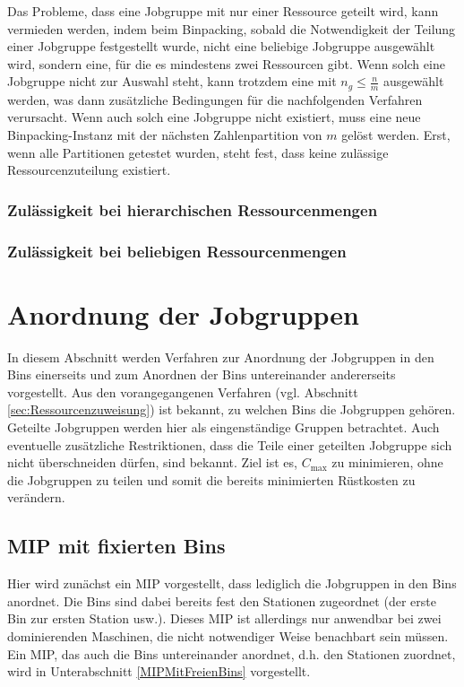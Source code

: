 \documentclass{scrreprt}
\begin{document}
Das Probleme, dass eine Jobgruppe mit nur einer Ressource geteilt wird, kann vermieden werden, indem beim Binpacking, 
sobald die Notwendigkeit der Teilung einer Jobgruppe festgestellt wurde,
nicht eine beliebige Jobgruppe ausgewählt wird, sondern eine, für die es mindestens zwei Ressourcen gibt.
Wenn solch eine Jobgruppe nicht zur Auswahl steht, kann trotzdem eine mit $n_g\leq\frac{n}{m}$ ausgewählt werden, was dann zusätzliche Bedingungen für die
nachfolgenden Verfahren verursacht. Wenn auch solch eine Jobgruppe nicht existiert, muss eine neue Binpacking-Instanz mit der nächsten Zahlenpartition von $m$ gelöst werden.
Erst, wenn alle Partitionen getestet wurden, steht fest, dass keine zulässige Ressourcenzuteilung existiert.

\subsubsection{Zulässigkeit bei hierarchischen Ressourcenmengen}


\subsubsection{Zulässigkeit bei beliebigen Ressourcenmengen}


\section{Anordnung der Jobgruppen}
\label{sec:AnordnungDerJobgruppen}
In diesem Abschnitt werden Verfahren zur Anordnung der Jobgruppen in den Bins einerseits und
zum Anordnen der Bins untereinander andererseits vorgestellt.
Aus den vorangegangenen Verfahren (vgl. Abschnitt \ref{sec:Ressourcenzuweisung}) ist bekannt, zu welchen Bins die Jobgruppen gehören.
Geteilte Jobgruppen werden hier als eingenständige Gruppen betrachtet.
Auch eventuelle zusätzliche Restriktionen, dass die Teile einer geteilten Jobgruppe sich nicht überschneiden dürfen, sind bekannt.
Ziel ist es, $C_{\max}$ zu minimieren, ohne die Jobgruppen zu teilen und somit die bereits minimierten Rüstkosten zu verändern.


\subsection{MIP mit fixierten Bins}
\label{subsec:MIPMitFixiertenBins}
Hier wird zunächst ein MIP vorgestellt, dass lediglich die Jobgruppen in den Bins anordnet.
Die Bins sind dabei bereits fest den Stationen zugeordnet (der erste Bin zur ersten Station usw.).
Dieses MIP ist allerdings nur anwendbar bei zwei dominierenden Maschinen, die nicht notwendiger Weise benachbart sein müssen.
Ein MIP, das auch die Bins untereinander anordnet, d.h. den Stationen zuordnet, wird in Unterabschnitt \ref{MIPMitFreienBins} vorgestellt.
\end{document}
